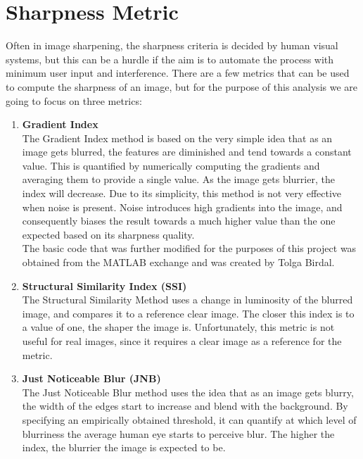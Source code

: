 \graphicspath{{mehul_pics/}}%

\section{Sharpness Metric}
Often in image sharpening, the sharpness criteria is decided by human visual systems, but this can be a hurdle if the aim is to automate the process with minimum user input and interference. There are a few metrics that can be used to compute the sharpness of an image, but for the purpose of this analysis we are going to focus on three metrics:

\begin{enumerate}
\item {\bf Gradient Index} \\
The Gradient Index method is based on the very simple idea that as an image gets blurred, the features are diminished and tend towards a constant value. This is quantified by numerically computing the gradients and averaging them to provide a single value. As the image gets blurrier, the index will decrease.
Due to its simplicity, this method is not very effective when noise is present. Noise introduces high gradients into the image, and consequently biases the result towards a much higher value than the one expected based on its sharpness quality.  \\
The basic code that was further modified for the purposes of this project was obtained from the MATLAB exchange and was created by Tolga Birdal.

\item {\bf Structural Similarity Index (SSI)~\cite{Wang:2004}} \\
The Structural Similarity Method uses a change in luminosity of the blurred image, and compares it to a reference clear image. The closer this index is to a value of one, the shaper the image is. Unfortunately, this metric is not useful for real images, since it requires a clear image as a reference for the metric.

\item {\bf Just Noticeable Blur (JNB)~\cite{Ferzli:2009}} \\
The Just Noticeable Blur method uses the idea that as an image gets blurry, the width of the edges start to increase and blend with the background. By specifying an empirically obtained threshold, it can quantify at which level of blurriness the average human eye starts to perceive blur. The higher the index, the blurrier the image is expected to be.
\end{enumerate}
\vspace{-15pt}
